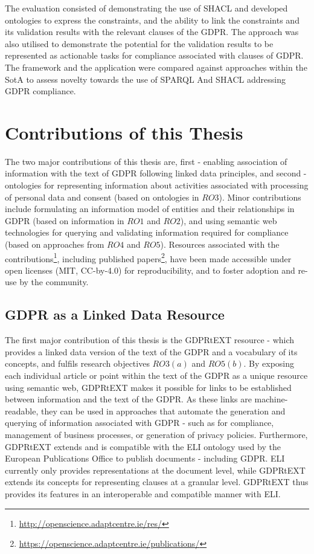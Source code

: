 The evaluation consisted of demonstrating the use of SHACL and developed ontologies to express the constraints, and the ability to link the constraints and its validation results with the relevant clauses of the GDPR.
The approach was also utilised to demonstrate the potential for the validation results to be represented as actionable tasks for compliance associated with clauses of GDPR.
The framework and the application were compared against approaches within the SotA to assess novelty towards the use of SPARQL And SHACL addressing GDPR compliance.

\section{Contributions of this Thesis}\label{sec:intro:contributions}
The two major contributions of this thesis are, first - enabling association of information with the text of GDPR following linked data principles, and second - ontologies for representing information about activities associated with processing of personal data and consent (based on ontologies in $RO3$). Minor contributions include formulating an information model of entities and their relationships in GDPR (based on information in $RO1$ and $RO2$), and using semantic web technologies for querying and validating information required for compliance (based on approaches from $RO4$ and $RO5$). Resources associated with the contributions\footnote{\url{http://openscience.adaptcentre.ie/res/}}, including published papers\footnote{\url{https://openscience.adaptcentre.ie/publications/}}, have been made accessible under open licenses (MIT,  CC-by-4.0) for reproducibility, and to foster adoption and re-use by the community.

\subsection{GDPR as a Linked Data Resource}
The first major contribution of this thesis is the GDPRtEXT resource - which provides a linked data version of the text of the GDPR and a vocabulary of its concepts, and fulfils research objectives $RO3(a)$ and $RO5(b)$. By exposing each individual article or point within the text of the GDPR as a unique resource using semantic web, GDPRtEXT makes it possible for links to be established between information and the text of the GDPR. As these links are machine-readable, they can be used in approaches that automate the generation and querying of information associated with GDPR - such as for compliance, management of business processes, or generation of privacy policies. Furthermore, GDPRtEXT extends and is compatible with the ELI ontology \cite{thomas_european_2019} used by the European Publications Office to publish documents - including GDPR. ELI currently only provides representations at the document level, while GDPRtEXT extends its concepts for representing clauses at a granular level. GDPRtEXT thus provides its features in an interoperable and compatible manner with ELI.

